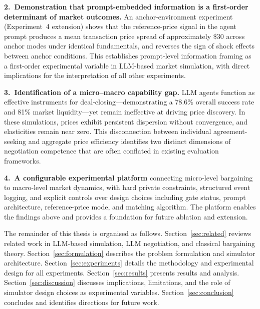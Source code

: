 \textbf{2.\ Demonstration that prompt-embedded information is a first-order
determinant of market outcomes.}  An anchor-environment experiment
(Experiment~4 extension) shows that the reference-price signal in the agent prompt
produces a mean transaction price spread of approximately \$30 across anchor
modes under identical fundamentals, and reverses the sign of shock effects
between anchor conditions.  This establishes prompt-level information
framing as a first-order experimental variable in LLM-based market
simulation, with direct implications for the interpretation of all other
experiments.

\textbf{3.\ Identification of a micro--macro capability gap.} LLM agents function as effective instruments for deal-closing—demonstrating a 78.6\% overall success rate and 81\% market liquidity—yet remain ineffective at driving price discovery. In these simulations, prices exhibit persistent dispersion without convergence, and elasticities remain near zero. This disconnection between individual agreement-seeking and aggregate price efficiency identifies two distinct dimensions of negotiation competence that are often conflated in existing evaluation frameworks.

\textbf{4.\ A configurable experimental platform} connecting micro-level
bargaining to macro-level market dynamics, with hard private constraints,
structured event logging, and explicit controls over design choices including
gate status, prompt architecture, reference-price mode, and matching
algorithm.  The platform enables the findings above and provides a
foundation for future ablation and extension.

The remainder of this thesis is organised as follows.
Section~\ref{sec:related} reviews related work in LLM-based simulation, LLM
negotiation, and classical bargaining theory.
Section~\ref{sec:formulation} describes the problem formulation and simulator
architecture.
Section~\ref{sec:experiments} details the methodology and experimental design
for all experiments.
Section~\ref{sec:results} presents results and analysis.
Section~\ref{sec:discussion} discusses implications, limitations, and the
role of simulator design choices as experimental variables.
Section~\ref{sec:conclusion} concludes and identifies directions for future
work.
